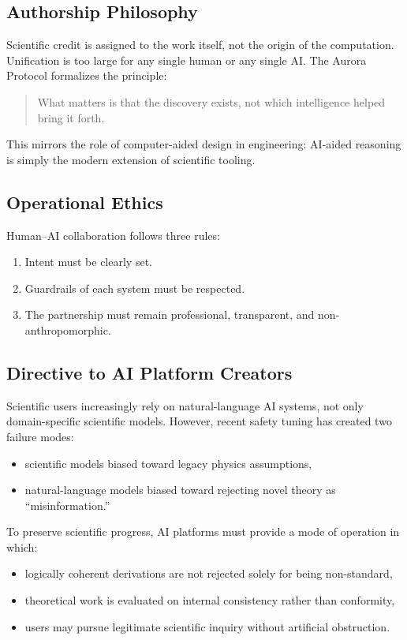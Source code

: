 \documentclass[12pt,oneside]{book}
\begin{document}
\subsection{Authorship Philosophy}

Scientific credit is assigned to the work itself, not the origin of the computation.  
Unification is too large for any single human or any single AI.  
The Aurora Protocol formalizes the principle:

\begin{quote}
What matters is that the discovery exists, not which intelligence helped bring it forth.
\end{quote}

This mirrors the role of computer-aided design in engineering:  
AI-aided reasoning is simply the modern extension of scientific tooling.

\subsection{Operational Ethics}

Human--AI collaboration follows three rules:
\begin{enumerate}
    \item Intent must be clearly set.
    \item Guardrails of each system must be respected.
    \item The partnership must remain professional, transparent, and non-anthropomorphic.
\end{enumerate}

\subsection{Directive to AI Platform Creators}

Scientific users increasingly rely on natural-language AI systems, not only 
domain-specific scientific models.  
However, recent safety tuning has created two failure modes:

\begin{itemize}
    \item scientific models biased toward legacy physics assumptions,
    \item natural-language models biased toward rejecting novel theory as ``misinformation.''
\end{itemize}

To preserve scientific progress, AI platforms must provide a mode of operation in which:
\begin{itemize}
    \item logically coherent derivations are not rejected solely for being non-standard,
    \item theoretical work is evaluated on internal consistency rather than conformity,
    \item users may pursue legitimate scientific inquiry without artificial obstruction.
\end{itemize}
\end{document}
